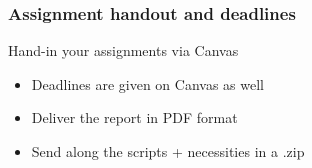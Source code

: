 \documentclass[11pt,table,final,fleqn,xcolor={usenames,dvipsnames},handout]{beamer}
\begin{document}
%

%
\begin{frame}
 \frametitle{Assignment handout and deadlines}
     Hand-in your assignments via Canvas
    \begin{itemize}
      \item Deadlines are given on Canvas as well
      \item Deliver the report in PDF format
      \item Send along the scripts + necessities in a .zip
    \end{itemize}
\end{frame}
% 
\end{document}
